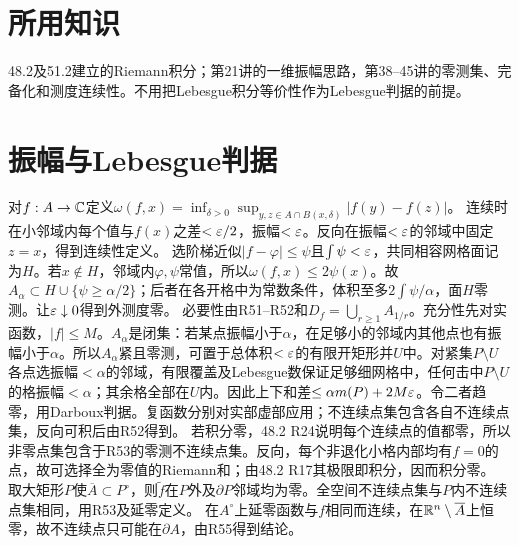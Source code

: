 \documentclass[UTF8,fontset=fandol,11pt]{ctexart}
\begin{document}
\section*{所用知识}
48.2及51.2建立的Riemann积分；第21讲的一维振幅思路，第38--45讲的零测集、完备化和测度连续性。不用把Lebesgue积分等价性作为Lebesgue判据的前提。
\section{振幅与Lebesgue判据}
对$f:A\to\mathbb C$定义$\omega(f,x)=\inf_{\delta>0}\sup_{y,z\in A\cap B(x,\delta)}|f(y)-f(z)|$。
连续时在小邻域内每个值与$f(x)$之差$<\varepsilon/2$，振幅$<\varepsilon$。反向在振幅$<\varepsilon$的邻域中固定$z=x$，得到连续性定义。
选阶梯近似$|f-\varphi|\le\psi$且$\int\psi<\varepsilon$，共同相容网格面记为$H$。若$x\notin H$，邻域内$\varphi,\psi$常值，所以$\omega(f,x)\le2\psi(x)$。故$A_\alpha\subset H\cup\{\psi\ge\alpha/2\}$；后者在各开格中为常数条件，体积至多$2\int\psi/\alpha$，面$H$零测。让$\varepsilon\downarrow0$得到外测度零。
必要性由R51--R52和$D_f=\bigcup_{r\ge1}A_{1/r}$。充分性先对实函数，$|f|\le M$。$A_\alpha$是闭集：若某点振幅小于$\alpha$，在足够小的邻域内其他点也有振幅小于$\alpha$。所以$A_\alpha$紧且零测，可置于总体积$<\varepsilon$的有限开矩形并$U$中。对紧集$P\setminus U$各点选振幅$<\alpha$的邻域，有限覆盖及Lebesgue数保证足够细网格中，任何击中$P\setminus U$的格振幅$<\alpha$；其余格全部在$U$内。因此上下和差$\le\alpha m(P)+2M\varepsilon$。令二者趋零，用Darboux判据。复函数分别对实部虚部应用；不连续点集包含各自不连续点集，反向可积后由R52得到。
若积分零，48.2 R24说明每个连续点的值都零，所以非零点集包含于R53的零测不连续点集。反向，每个非退化小格内部均有$f=0$的点，故可选择全为零值的Riemann和；由48.2 R17其极限即积分，因而积分零。
取大矩形$P$使$\overline A\subset P^\circ$，则$\widetilde f$在$P$外及$\partial P$邻域均为零。全空间不连续点集与$P$内不连续点集相同，用R53及延零定义。
在$A^\circ$上延零函数与$f$相同而连续，在$\mathbb R^n\setminus\overline A$上恒零，故不连续点只可能在$\partial A$，由R55得到结论。
\end{document}
